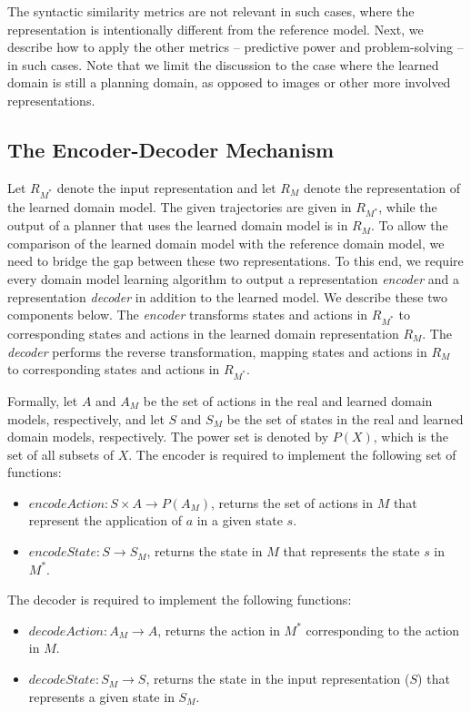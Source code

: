 \documentclass{article}
\theoremstyle{definition}
\theoremstyle{remark}
\newcommand{\realm}{{\ensuremath{M^*}}\xspace}
\newif\ifaddcomments
\newcommand{\yarin}[1]{\ifaddcomments{\textcolor{teal}{[Yarin: #1]}}\fi}
\begin{document}
The syntactic similarity metrics are not relevant in such cases, where the representation is intentionally different from the reference model. Next, we describe how to apply the other metrics -- predictive power and problem-solving -- in such cases. 
Note that we limit the discussion to the case where the learned domain is still a planning domain, as opposed to images or other more involved representations. 

\subsection{The Encoder-Decoder Mechanism}
Let $R_{\realm}$ denote the input representation and let $R_M$ denote the representation of the learned domain model. 
The given trajectories are given in $R_{\realm}$, 
while the output of a planner that uses the learned domain model is in $R_M$. 
To allow the comparison of the learned domain model with the reference domain model, we need to bridge the gap between these two representations. 
To this end, we require every domain model learning algorithm to output 
a representation \emph{encoder} and a representation \emph{decoder} in addition to the learned model. We describe these two components below.  
The \emph{encoder} transforms states and actions in $R_{\realm}$ to corresponding states and actions in the learned domain representation $R_M$. 
The \emph{decoder} performs the reverse transformation, mapping states and actions in $R_M$ to corresponding states and actions in $R_\realm$.


Formally, let $A$ and $A_M$ be the set of actions in the real and learned domain models, respectively, and let $S$ and $S_M$ be the set of states in the real and learned domain models, respectively. The power set is denoted by $P(X)$, which is the set of all subsets of $X$. 
The encoder is required to implement the following set of functions:
\begin{itemize}
    \item ${\mathit{encodeAction}: S\times A\rightarrow P(A_M)}$, returns the set of actions in $M$ that represent the application of $a$\yarin{$a \in A$} in a given state $s$\yarin{$s \in S$}. 
    \item ${\mathit{encodeState}: S\rightarrow S_M}$, returns the state in $M$ that represents the state $s$ in $\realm$. \yarin{returns the state $s \in S$ as its representation in $S_M$}
\end{itemize}
The decoder is required to implement the following functions:
\begin{itemize}
    \item ${\mathit{decodeAction}: A_M\rightarrow A}$, returns the action in $\realm$ corresponding to the action in $M$. \yarin{returns the action $a \in A_M$ as its representation in $A$}
    \item ${\mathit{decodeState}: S_M\rightarrow S}$, returns the state in the input representation ($S$) that represents a given state in $S_M$. \yarin{returns the state $s \in S_M$ as its representation in $S$}
\end{itemize}
\end{document}
